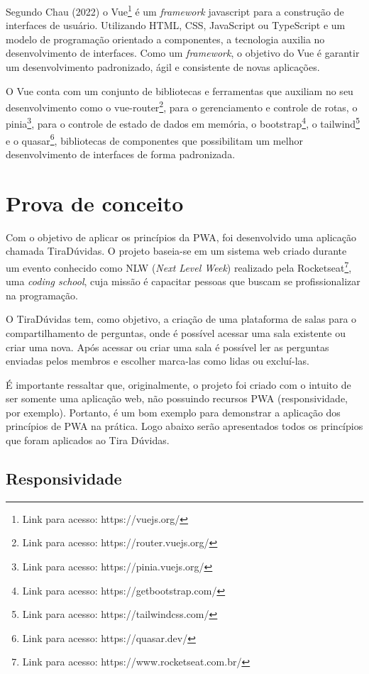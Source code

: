 \documentclass[12pt]{article}
\begin{document}
Segundo Chau (2022) o Vue\footnote{Link para acesso: https://vuejs.org/} é um \textit{framework} javascript para a construção de interfaces de usuário. Utilizando HTML, CSS, JavaScript ou TypeScript e um modelo de programação orientado a componentes, a tecnologia auxilia no desenvolvimento de interfaces. Como um \textit{framework}, o objetivo do Vue é garantir um desenvolvimento padronizado, ágil e consistente de novas aplicações.

O Vue conta com um conjunto de bibliotecas e ferramentas que auxiliam no seu desenvolvimento como o vue-router\footnote{Link para acesso: https://router.vuejs.org/}, para o gerenciamento e controle de rotas, o pinia\footnote{Link para acesso:  https://pinia.vuejs.org/}, para o controle de estado de dados em memória, o bootstrap\footnote{Link para acesso: https://getbootstrap.com/}, o tailwind\footnote{Link para acesso: https://tailwindcss.com/} e o quasar\footnote{Link para acesso: https://quasar.dev/}, bibliotecas de componentes que possibilitam um melhor desenvolvimento de interfaces de forma padronizada. 

\section{Prova de conceito} \label{sec:tira_duvidas}

Com o objetivo de aplicar os princípios da PWA, foi desenvolvido uma aplicação chamada TiraDúvidas. O projeto baseia-se em um sistema web criado durante um evento conhecido como NLW (\textit{Next Level Week}) realizado pela Rocketseat\footnote{Link para acesso: https://www.rocketseat.com.br/}, uma \textit{coding school}, cuja missão é capacitar pessoas que buscam se profissionalizar na programação.

O TiraDúvidas tem, como objetivo, a criação de uma plataforma de salas para o compartilhamento de perguntas, onde é possível acessar uma sala existente ou criar uma nova. Após acessar ou criar uma sala é possível ler as perguntas enviadas pelos membros e escolher marca-las como lidas ou excluí-las.

É importante ressaltar que, originalmente, o projeto foi criado com o intuito de ser somente uma aplicação web, não possuindo recursos PWA (responsividade, por exemplo). Portanto, é um bom exemplo para demonstrar a aplicação dos princípios de PWA na prática. Logo abaixo serão apresentados todos os princípios que foram aplicados ao Tira Dúvidas.

\subsection{Responsividade} \label{sec:responsividade}
\end{document}
